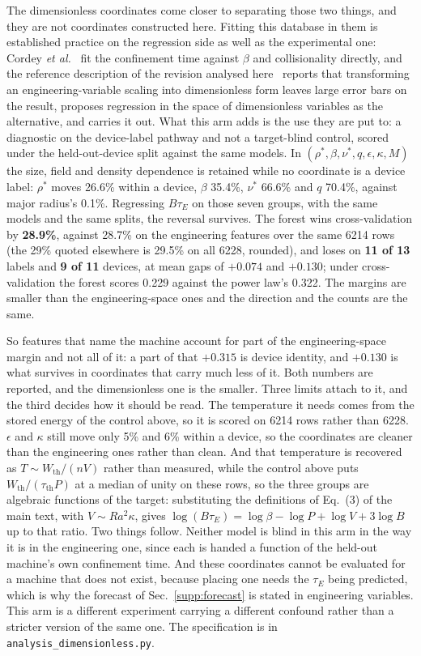 \documentclass[12pt,letterpaper]{article}
\begin{document}
The dimensionless coordinates come closer to separating those two things, and
they are not coordinates constructed here. Fitting this database in them is established
practice on the regression side as well as the experimental one: Cordey
\emph{et al.}~\cite{cordey} fit the confinement time against $\beta$ and
collisionality directly, and the reference description of the revision analysed
here~\cite{hdb5} reports that transforming an engineering-variable scaling into
dimensionless form leaves large error bars on the result, proposes regression in
the space of dimensionless variables as the alternative, and carries it out.
What this arm adds is the use they are put to: a diagnostic on the
device-label pathway and not a target-blind control, scored under the
held-out-device split against the same models. In
$(\rho^{*},\beta,\nu^{*},q,\epsilon,\kappa,M)$ the size, field and density
dependence is retained while no coordinate is a device label: $\rho^{*}$ moves
26.6\% within a device, $\beta$ 35.4\%, $\nu^{*}$ 66.6\% and $q$ 70.4\%, against
major radius's 0.1\%. Regressing $B\tau_{E}$ on those seven groups, with the
same models and the same splits, the reversal survives. The forest wins
cross-validation by \textbf{28.9\%}, against 28.7\% on the engineering features
over the same 6214 rows (the 29\% quoted elsewhere is 29.5\% on all 6228,
rounded), and loses on \textbf{11 of 13} labels and \textbf{9 of 11} devices, at mean gaps
of $+0.074$ and $+0.130$; under cross-validation the forest scores 0.229 against
the power law's 0.322. The margins are smaller than the engineering-space
ones and the direction and the counts are the same.

So features that name the machine account for part of the engineering-space
margin and not all of it: a part of that $+0.315$ is device identity, and
$+0.130$ is what survives in coordinates that carry much less of it. Both numbers are reported, and the
dimensionless one is the smaller. Three limits attach to it, and the third
decides how it should be read. The temperature it needs comes from the stored
energy of the control above, so it is scored on 6214 rows rather than 6228.
$\epsilon$ and $\kappa$ still move only 5\% and 6\% within a device, so the
coordinates are cleaner than the engineering ones rather than clean. And that
temperature is recovered as $T\sim W_{\mathrm{th}}/(nV)$ rather than measured,
while the control above puts $W_{\mathrm{th}}/(\tau_{\mathrm{th}}P)$ at a median
of unity on these rows, so the three groups are algebraic functions of the
target: substituting the definitions of Eq.~(3) of the main text, with
$V\sim Ra^{2}\kappa$, gives
$\log(B\tau_{E}) = \log\beta - \log P + \log V + 3\log B$ up to that ratio.
Two things follow. Neither model is blind in this arm in the way it is in the
engineering one, since each is handed a function of the held-out machine's own
confinement time. And these coordinates cannot be evaluated for a machine that
does not exist, because placing one needs the $\tau_{E}$ being predicted, which
is why the forecast of Sec.~\ref{supp:forecast} is stated in
engineering variables. This arm is a different experiment carrying a different confound
rather than a stricter version of the same one. The specification is in
\texttt{analysis\_dimensionless.py}.
\end{document}
